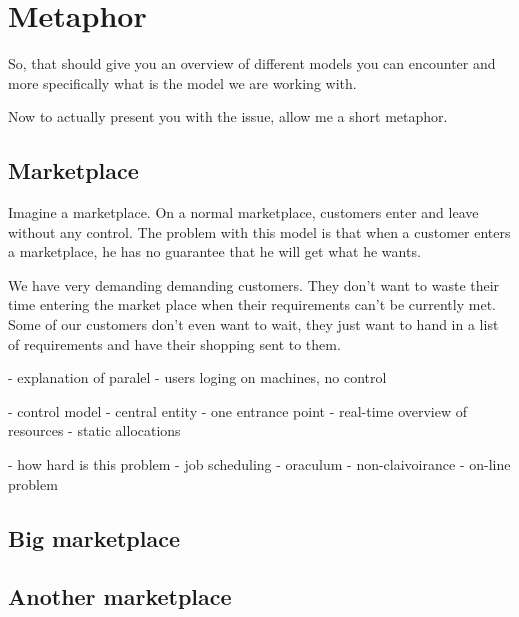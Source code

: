 \documentclass[10pt]{article}
\begin{document}
\section{Metaphor}

So, that should give you an overview of different models you can encounter and
more specifically what is the model we are working with.

Now to actually present you with the issue, allow me a short metaphor.

\subsection{Marketplace}

Imagine a marketplace. On a normal marketplace, customers enter and leave
without any control. The problem with this model is that when a customer enters
a marketplace, he has no guarantee that he will get what he wants.

We have very demanding demanding customers. They don't want to waste their time
entering the market place when their requirements can't be currently met. Some
of our customers don't even want to wait, they just want to hand in a list of
requirements and have their shopping sent to them.

- explanation of paralel
 - users loging on machines, no control

- control model
  - central entity - one entrance point
  - real-time overview of resources
  - static allocations

- how hard is this problem
  - job scheduling
  - oraculum
  - non-claivoirance
  - on-line problem

\subsection{Big marketplace}

\subsection{Another marketplace}
\end{document}

